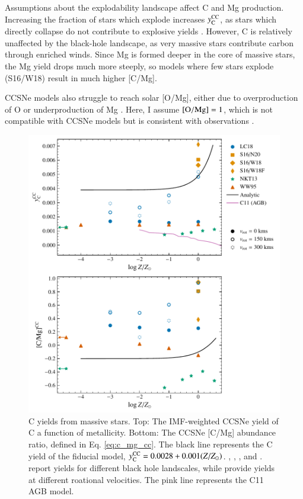 \documentclass[12pt,oneside]{report}
\newcommand{\Ycc}{\ensuremath{y_{\rm C}^{\rm CC}}}
\begin{document}
Assumptions about the explodability landscape affect C and Mg production. Increasing the fraction of stars which explode increases $\Ycc$, as stars which directly collapse do not contribute to explosive yields \citep{emily+21}. However, C is relatively unaffected by the black-hole landscape, as very massive stars contribute carbon through enriched winds. Since Mg is formed deeper in the core of massive stars, the Mg yield drops much more steeply, so models where few stars explode (S16/W18) result in much higher [C/Mg].

CCSNe models also struggle to reach solar [O/Mg], either due to overproduction of O or underproduction of Mg \citep{emily+21}. Here, I assume ${\rm [O/Mg]} = 1$, which is not compatible with CCSNe models but is consistent with observations \cite{Weinberg+19, Weinberg+22}.
    

\begin{figure}[htp]
    \centering
    \includegraphics{y_c_cc.pdf}
    \caption[CCSNe C yields]{
        C yields from massive stars.
        Top: The IMF-weighted CCSNe yield of C a function of metallicity.
        Bottom: The CCSNe [C/Mg] abundance ratio, defined in Eq. \ref{eq:c_mg_cc}. The black line represents the C yield of the fiducial model,
    $\Ycc = 0.0028 + 0.001 (Z/Z_{\odot})$. 
    \citet[red triangles]{WW95}, \citet[orange squares and diamonds]{sukhbold+16}, 
    \citet[green stars]{NKT13}, and \citet[blue circles]{LC18}. \citet{sukhbold+16} report yields for different black hole landscales, while \citet{LC18} provide yields at different roational velocities.
The pink line represents the C11 AGB model.
}
    \label{fig:y_cc}
\end{figure}
\end{document}
